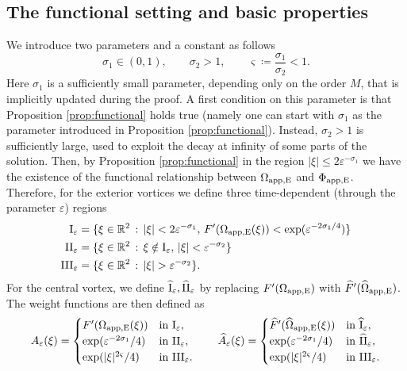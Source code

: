 \documentclass[11pt,reqno,a4paper]{amsart}
\def\eps{\varepsilon}
\def\RR {\mathbb{R}}
\newcommand{\1}{\mathbbm{1}}
\theoremstyle{definition}
\theoremstyle{definition}
\numberwithin{equation}{section}
\begin{document}
\subsection{The functional setting and basic properties}
\label{sec:functional}
We introduce two parameters and a constant as follows 
$$\sigma_1\in (0,1), \qquad \sigma_2>1, \qquad \varsigma\coloneqq \frac{\sigma_1}{\sigma_2}<1.$$ Here $\sigma_1$ is a sufficiently small parameter, depending only on the order $M$, that is implicitly updated during the proof. A first condition on this parameter is that Proposition \ref{prop:functional} holds true (namely one can start with $\sigma_1$ as the parameter introduced in Proposition \ref{prop:functional}). Instead, $\sigma_2>1$ is sufficiently large, used to exploit the decay at infinity of some parts of the solution. Then, by Proposition \ref{prop:functional} in the region $|\xi|\leq 2\eps^{-\sigma_1}$ we have the existence of the functional relationship between $\Omega_{\rm app,E}$ and $\Phi_{\rm app,E}$. Therefore, for the exterior vortices we define three time-dependent (through the parameter $\eps$) regions
\begin{align}
    {\rm I}_{\eps}&=\{\xi\in\RR^2\, :\, |\xi|<2\eps^{-\sigma_1}, \, F'(\Omega_{\rm app, E}(\xi))<\exp(\eps^{-2\sigma_1/4})\}\\
    {\rm II}_{\eps}&=\{\xi\in\RR^2\, :\, \xi \notin {\rm I}_{\eps},\, |\xi|<\eps^{-\sigma_2}\}\\
    {\rm III}_{\eps}&=\{\xi\in\RR^2\, :\, |\xi|>\eps^{-\sigma_2}\}.
\end{align}
For the central vortex, we define ${\rm \widehat I}_\eps, {\rm \widehat{II}}_\eps$ by replacing $F'(\Omega_{\rm app,E})$ with  $\widehat{F}'(\widehat{\Omega}_{\rm app,E})$.
The weight functions are then defined as 
\begin{align}
    A_{\eps}(\xi)=\begin{cases}
        F'(\Omega_{\rm app,E}(\xi)) &\text{in } {\rm I}_\eps,\\
    \exp(\eps^{-2\sigma_1}/4)&\text{in } {\rm II}_\eps,\\
    \exp(|\xi|^{2\varsigma}/4)&\text{in } {\rm III}_\eps.
    \end{cases}\qquad  \widehat{A}_{\eps}(\xi)=\begin{cases}
        \widehat{F}'(\widehat{\Omega}_{\rm app,E}(\xi)) &\text{in } {\rm \widehat{I}}_\eps,\\
    \exp(\eps^{-2\sigma_1}/4)&\text{in } {\rm \widehat{II}}_\eps,\\
    \exp(|\xi|^{2\varsigma}/4)&\text{in } {\rm III}_\eps.
    \end{cases}
\end{align}
\end{document}

